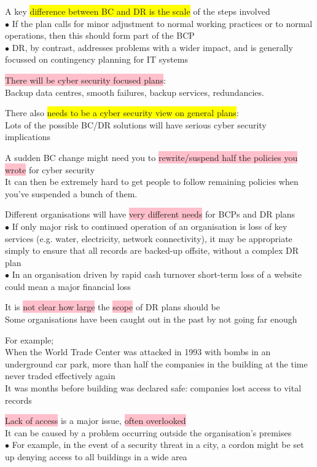 \documentclass[tikz,border=10pt]{project_plan}
\newcommand{\bulletPoint}{\hspace{-3.1pt}$\bullet$ \hspace{5pt}}
\begin{document}
A key \colorbox{yellow}{difference between BC and DR is the scale} of the steps involved\\
\bulletPoint If the plan calls for minor adjustment to normal working practices or to
normal operations, then this should form part of the BCP\\
\bulletPoint DR, by contrast, addresses problems with a wider impact, and
is generally focussed on contingency planning for IT systems

\colorbox{pink}{There will be cyber security focused plans}:\\
Backup data centres, smooth failures, backup services, redundancies.

There also \colorbox{yellow}{needs to be a cyber security view on general plans}:\\
Lots of the possible BC/DR solutions will have serious cyber security implications

A sudden BC change might need you to \colorbox{pink}{rewrite/suspend half the policies you wrote} for cyber security\\
It can then be extremely hard to get people to follow remaining policies when
you’ve suspended a bunch of them.

Different organisations will have \colorbox{pink}{very different needs} for BCPs and DR plans\\
\bulletPoint If only major risk to continued operation of an organisation is loss of key services (e.g. water, electricity, network connectivity),
it may be appropriate simply to ensure that all records are backed-up offsite, without a complex DR plan\\
\bulletPoint In an organisation driven by rapid cash turnover short-term loss of a website could mean a major financial loss

It is \colorbox{pink}{not clear how large} the \colorbox{pink}{scope} of DR plans should be\\
Some organisations have been caught out in the past by not going far enough

For example;\\
When the World Trade Center was attacked in 1993 with bombs in an underground
car park, more than half the companies in the building at the time never
traded effectively again\\
It was months before building was declared safe:  companies lost access to vital records

\colorbox{pink}{Lack of access} is a major issue, \colorbox{pink}{often overlooked}\\
It can be caused by a problem occurring outside the organisation’s premises\\
\bulletPoint For example, in the event of a security threat in a city, a cordon
might be set up denying access to all buildings in a wide area
\end{document}
